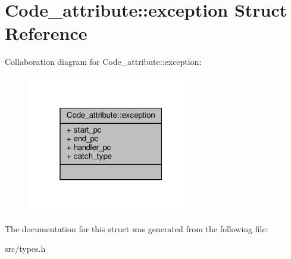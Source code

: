\hypertarget{structCode__attribute_1_1exception}{}\section{Code\+\_\+attribute\+:\+:exception Struct Reference}
\label{structCode__attribute_1_1exception}


Collaboration diagram for Code\+\_\+attribute\+:\+:exception\+:\nopagebreak
\begin{figure}[H]
\begin{center}
\leavevmode
\includegraphics[width=208pt]{structCode__attribute_1_1exception__coll__graph}
\end{center}
\end{figure}


The documentation for this struct was generated from the following file\+:\begin{DoxyCompactItemize}
\item 
src/types.\+h\end{DoxyCompactItemize}

